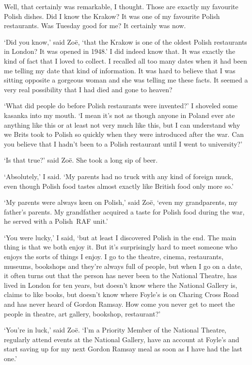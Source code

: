 Well, that certainly was remarkable, I thought. Those are exactly my
favourite Polish dishes. Did I know the Krakow? It was one of my
favourite Polish restaurants. Was Tuesday good for me? It certainly
was now.

\vskip 45pt

`Did you know,' said Zoë, `that the Krakow is one of the oldest
Polish restaurants in London? It was opened in 1948.' I did indeed
know that. It was exactly the kind of fact that I loved to collect.
I recalled all too many dates when it had been me telling my date
that kind of information. It was hard to believe that I was sitting
opposite a gorgeous woman and she was telling me these facts. It
seemed a very real possibility that I had died and gone to heaven?

`What did people do before Polish restaurants were invented?' I
shoveled some kasanka into my mouth. `I mean it's not as though
anyone in Poland ever ate anything like this or at least not very
much like this, but I can understand why we Brits took to Polish so
quickly when they were introduced after the war. Can you believe
that I hadn't been to a Polish restaurant until I went to
university?'

`Is that true?' said Zoë. She took a long sip of beer.

`Absolutely,' I said. `My parents had no truck with any kind of
foreign muck, even though Polish food tastes almost exactly like
British food only more so.'

`My parents were always keen on Polish,' said Zoë, `even my
grandparents, my father's parents. My grandfather acquired a taste
for Polish food during the war, he served with a Polish~RAF unit.'

`You were lucky,' I said, `but at least I discovered Polish in the
end. The main thing is that we both enjoy it. But it's surprisingly
hard to meet someone who enjoys the sorts of things I enjoy. I go to
the theatre, cinema, restaurants, museums, bookshops and they're
always full of people, but when I go on a date, it often turns out
that the person has never been to the National Theatre, has lived in
London for ten years, but doesn't know where the National Gallery
is, claims to like books, but doesn't know where Foyle's is on
Charing Cross Road and has never heard of Gordon Ramsay. How come
you never get to meet the people in theatre, art gallery, bookshop,
restaurant?'

`You're in luck,' said Zoë. `I'm a Priority Member of the
National Theatre, regularly attend events at the National Gallery,
have an account at Foyle's and start saving up for my next Gordon
Ramsay meal as soon as I have had the last one.'

